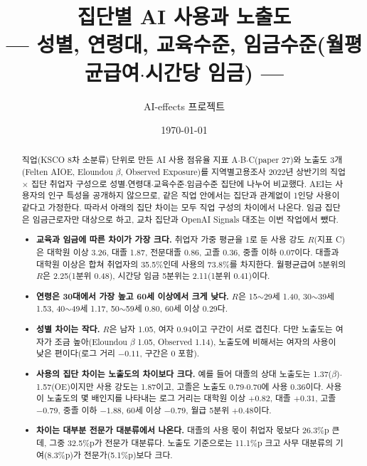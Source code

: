 \documentclass[11pt]{article}
\title{집단별 AI 사용과 노출도\\[2mm]
\large --- 성별, 연령대, 교육수준, 임금수준(월평균급여$\cdot$시간당 임금) ---}
\author{AI-effects 프로젝트}
\date{\today}
\begin{document}
\maketitle

\begin{abstract}
\noindent 직업(KSCO 8차 소분류) 단위로 만든 AI 사용 점유율 지표 A$\cdot$B$\cdot$C(paper 27)와 노출도 3개(Felten AIOE\parencite{felten-2023-how-will-language-modelers-like-chatgpt}, Eloundou $\beta$\parencite{eloundou-2023-gpts-are-gpts-an-early}, Observed Exposure\parencite{massenkoff-2026-labor-market-impacts-of-ai})를 지역별고용조사 2022년 상반기의 직업 $\times$ 집단 취업자 구성으로 성별$\cdot$연령대$\cdot$교육수준$\cdot$임금수준 집단에 나누어 비교했다. AEI는 사용자의 인구 특성을 공개하지 않으므로, 같은 직업 안에서는 집단과 관계없이 1인당 사용이 같다고 가정한다. 따라서 아래의 집단 차이는 모두 직업 구성의 차이에서 나온다. 임금 집단은 임금근로자만 대상으로 하고, 교차 집단과 OpenAI Signals 대조는 이번 작업에서 뺐다.
\begin{itemize}[leftmargin=*]
  \item \textbf{교육과 임금에 따른 차이가 가장 크다.} 취업자 가중 평균을 1로 둔 사용 강도 $R$(지표 C)은 대학원 이상 3.26, 대졸 1.87, 전문대졸 0.86, 고졸 0.36, 중졸 이하 0.07이다. 대졸과 대학원 이상은 합쳐 취업자의 35.5\%인데 사용의 73.8\%를 차지한다. 월평균급여 5분위의 $R$은 2.25(1분위 0.48), 시간당 임금 5분위는 2.11(1분위 0.41)이다.
  \item \textbf{연령은 30대에서 가장 높고 60세 이상에서 크게 낮다.} $R$은 15$\sim$29세 1.40, 30$\sim$39세 1.53, 40$\sim$49세 1.17, 50$\sim$59세 0.80, 60세 이상 0.29다.
  \item \textbf{성별 차이는 작다.} $R$은 남자 1.05, 여자 0.94이고 구간이 서로 겹친다. 다만 노출도는 여자가 조금 높아(Eloundou $\beta$ 1.05, Observed 1.14), 노출도에 비해서는 여자의 사용이 낮은 편이다(로그 거리 $-0.11$, 구간은 0 포함).
  \item \textbf{사용의 집단 차이는 노출도의 차이보다 크다.} 예를 들어 대졸의 상대 노출도는 1.37($\beta$)$\cdot$1.57(OE)이지만 사용 강도는 1.87이고, 고졸은 노출도 0.79$\cdot$0.70에 사용 0.36이다. 사용이 노출도의 몇 배인지를 나타내는 로그 거리는 대학원 이상 $+0.82$, 대졸 $+0.31$, 고졸 $-0.79$, 중졸 이하 $-1.88$, 60세 이상 $-0.79$, 월급 5분위 $+0.48$이다.
  \item \textbf{차이는 대부분 전문가 대분류에서 나온다.} 대졸의 사용 몫이 취업자 몫보다 26.3\%p 큰데, 그중 32.5\%p가 전문가 대분류다. 노출도 기준으로는 11.1\%p 크고 사무 대분류의 기여(8.3\%p)가 전문가(5.1\%p)보다 크다.
\end{itemize}
\end{abstract}
\end{document}
